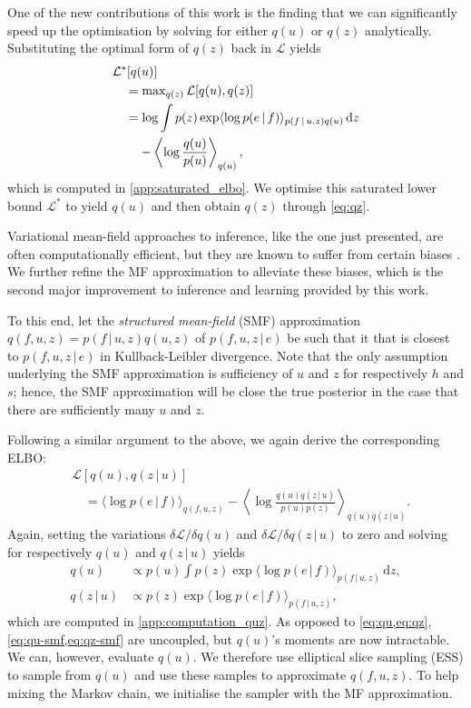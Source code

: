 \documentclass{article}
\renewcommand{\max}{\operatorname{max}}
\newcommand{\id}[1]{\, \mathrm{d} #1}     %
\newcommand{\cond}{\, | \,}               %
\renewcommand{\ll}{\left}
\newcommand{\rr}{\right}
\newcommand{\la}{\langle}
\newcommand{\ra}{\rangle}
\newcommand{\phan}[1]{\hphantom{#1\;}}
\begin{document}
One of the new contributions of this work is the finding that we can significantly speed up the optimisation by solving for either $q(u)$ or $q(z)$ analytically. Substituting the optimal form of $q(z)$ back in $\mathcal{L}$ yields
\begin{align}
    &\mathcal{L}^*[q(u)] \nonumber\\
    &\quad=\max_{q(z)} \mathcal{L}[q(u),q(z)]\nonumber\\
    &\quad= \log \int p(z)\exp \la \log p(e\cond f) \ra_{p(f\cond u, z)q(u)} \id{z} \nonumber\\
    &\quad\phan{=}-\ll\la\log\frac{q(u)}{p(u)}\rr\ra_{q(u)},\label{eq:saturated_elbo}
\end{align}
which is computed in \cref{app:saturated_elbo}. We optimise this saturated lower bound $\mathcal{L}^*$ to yield $q(u)$ and then obtain $q(z)$ through \cref{eq:qz}.

Variational mean-field approaches to inference, like the one just presented, are often computationally efficient, but they are known to suffer from certain biases \cite{MacKay:2002:Information_Theory_Learning,Turner:2011:Two_Problems_With_Variational_Expectation,Murphy:2012:Probabilistic_Perspective}. We further refine the MF approximation to alleviate these biases, which is the second major improvement to inference and learning provided by this work.

To this end, let the \textit{structured mean-field} (SMF) approximation $q(f,u,z)=p(f\cond u, z)q(u,z)$ of $p(f,u,z\cond e)$ be such that it that is closest to $p(f,u,z\cond e)$ in Kullback-Leibler divergence. Note that the only assumption underlying the SMF approximation is sufficiency of $u$ and $z$ for respectively $h$ and $s$; hence, the SMF approximation will be close the true posterior in the case that there are sufficiently many $u$ and $z$.

Following a similar argument to the above, we again derive the corresponding ELBO:
\begin{align*}
    &\mathcal{L}[q(u),q(z\cond u)] \\
    &\quad= \la \log p(e\cond f) \ra_{q(f,u,z)}- \ll\la\log\frac{q(u)q(z\cond u)}{p(u)p(z)}\rr\ra_{q(u)q(z\cond u)}.
\end{align*}
Again, setting the variations $\delta \mathcal{L} / \delta q(u)$ and $\delta \mathcal{L} / \delta q(z\cond u)$ to zero and solving for respectively $q(u)$ and $q(z\cond u)$ yields
\begin{align}
    q(u) &\propto p(u) \int p(z) \exp\la\log p(e\cond f)\ra_{p(f\cond u, z)}\id{z}, \label{eq:qu-smf} \\
    q(z\cond u) &\propto p(z)\exp\la \log p(e\cond f)\ra_{p(f\cond u, z)}, \label{eq:qz-smf}
\end{align}
which are computed in \cref{app:computation_quz}.
As opposed to \cref{eq:qu,eq:qz}, \cref{eq:qu-smf,eq:qz-smf} are uncoupled, but $q(u)$'s moments are now intractable. We can, however, evaluate $q(u)$. We therefore use elliptical slice sampling (ESS) \cite{Murray:2010:Elliptical_Slice_Sampling} to sample from $q(u)$ and use these samples to approximate $q(f, u, z)$. To help mixing the Markov chain, we initialise the sampler with the MF approximation.
\end{document}
